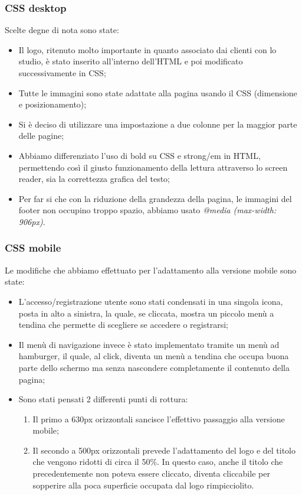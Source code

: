 \subsubsection{CSS desktop}
\label{frontend:css}
Scelte degne di nota sono state:
\begin{itemize}
\item Il logo, ritenuto molto importante in quanto associato dai clienti con lo studio, è stato inserito all’interno dell’HTML e poi modificato successivamente in CSS;
\item Tutte le immagini sono state adattate alla pagina usando il CSS (dimensione e posizionamento);
\item Si è deciso di utilizzare una impostazione a due colonne per la maggior parte delle pagine;
\item Abbiamo differenziato l’uso di bold su CSS e strong/em in HTML, permettendo così il giusto funzionamento della lettura attraverso lo screen reader, sia la correttezza grafica del testo;
\item Per far si che con la riduzione della grandezza della pagina, le immagini del footer non occupino troppo spazio, abbiamo usato \textit{@media (max-width: 906px)}.
\end{itemize}

\subsubsection{CSS mobile}
Le modifiche che abbiamo effettuato per l’adattamento alla versione mobile sono state:
\begin{itemize}
\item L’accesso/registrazione utente sono stati condensati in una singola icona, posta in alto a sinistra, la quale, se cliccata, mostra un piccolo menù a tendina che permette di scegliere se accedere o registrarsi;
\item Il menù di navigazione invece è stato implementato tramite un menù ad hamburger, il quale, al click, diventa un menù a tendina che occupa buona parte dello schermo ma senza nascondere completamente il contenuto della pagina;
\item Sono stati pensati 2 differenti punti di rottura:
\begin{enumerate}
\item Il primo a 630px orizzontali sancisce l’effettivo passaggio alla versione mobile;
\item Il secondo a 500px orizzontali prevede l’adattamento del logo e del titolo che vengono ridotti di circa il 50\%. In questo caso, anche il titolo che precedentemente non poteva essere cliccato, diventa cliccabile per sopperire alla poca superficie occupata dal logo rimpicciolito.
\end{enumerate}
\end{itemize}

